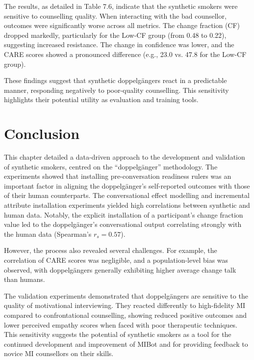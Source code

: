 The results, as detailed in Table 7.6, indicate that the synthetic smokers were sensitive to counselling quality. When interacting with the bad counsellor, outcomes were significantly worse across all metrics. The change fraction (CF) dropped markedly, particularly for the Low-CF group (from 0.48 to 0.22), suggesting increased resistance. The change in confidence was lower, and the CARE scores showed a pronounced difference (e.g., 23.0 vs. 47.8 for the Low-CF group).

These findings suggest that synthetic doppelgängers react in a predictable manner, responding negatively to poor-quality counselling. This sensitivity highlights their potential utility as evaluation and training tools.

\section{Conclusion}

This chapter detailed a data-driven approach to the development and validation of synthetic smokers, centred on the ``doppelgänger'' methodology. The experiments showed that installing pre-conversation readiness rulers was an important factor in aligning the doppelgänger's self-reported outcomes with those of their human counterparts. The conversational effect modelling and incremental attribute installation experiments yielded high correlations between synthetic and human data. Notably, the explicit installation of a participant's change fraction value led to the doppelgänger's conversational output correlating strongly with the human data (Spearman's $r_{s}=0.57$).

However, the process also revealed several challenges. For example, the correlation of CARE scores was negligible, and a population-level bias was observed, with doppelgängers generally exhibiting higher average change talk than humans.

The validation experiments demonstrated that doppelgängers are sensitive to the quality of motivational interviewing. They reacted differently to high-fidelity MI compared to confrontational counselling, showing reduced positive outcomes and lower perceived empathy scores when faced with poor therapeutic techniques. This sensitivity suggests the potential of synthetic smokers as a tool for the continued development and improvement of MIBot and for providing feedback to novice MI counsellors on their skills.